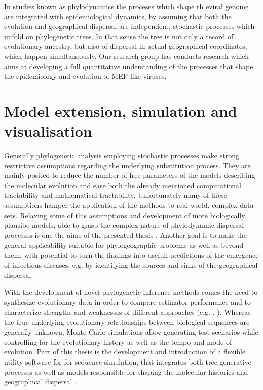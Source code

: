 \documentclass[12pt,twoside]{mitthesis}
\theoremstyle{plain}
\theoremstyle{definition}
\theoremstyle{remark}
\begin{document}
In studies known as phylodynamics the proceses which shape th eviral genome are integrated with epidemiological dynamics, by assuming that both the evolution and 
geographical dispersal are independent, stochastic processes which unfold on phylogenetic trees.
In that sense the tree is not only a record of evolutionary ancestry, but also of dispersal in actual geographical coordinates, which happen simultaneously.
Our research group has conducts research which aims at developing a full quantitative understanding of the processes that shape the epidemiology and evolution of MEP-like viruses.

\section{Model extension, simulation and visualisation}

Generally phylogenetic analysis employing stochastic processes make strong restrictive assumptions regarding the underlying substitution process.
They are mainly posited to reduce the number of free parameters of the models describing the molecular evolution and ease both the already mentioned computational tractability and mathematical tractability.
Unfortunately many of these assumptions hamper the application of the methods to real-world, complex data-sets.
Relaxing some of this assumptions and development of more biologically plausibe models, able to grasp the complex nature of phylodynamic dispersal processes is one the aims of the presented thesis \citep{Bielejec2014a}.
Another goal is to make the general applicability suitable for phylogeographic problems as well as beyond them, with potential to turn the findings into usefull predictions of the emergence of infectious diseases, e.g. by identifying the sources and sinks of the geographical dispersal.

With the development of novel phylogenetic inference methods comes the need to synthesize evolutionary data in order to compare estimator performance and to characterize strengths and weaknesses of different approaches (e.g. \cite{Arenas2012}, \cite{Hoban2011}).
Whereas the true underlying evolutionary relationships between biological sequences are generally unknown, Monte Carlo simulations allow generating test scenarios while controlling for the evolutionary history as well as the tempo and mode of evolution. 
Part of this thesis is the development and introduction of a flexible utility software for for sequence simulation, that integrates both tree-generative processes as well as models responsible for shaping the molecular histories and geographical dispersal \citep{bielejec2014}.
\end{document}
